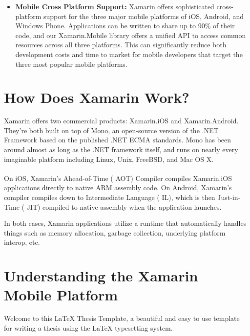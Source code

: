 \begin{itemize}
   \item \textbf{Mobile Cross Platform Support:}   Xamarin offers sophisticated cross-platform support for the three major mobile platforms of iOS, Android, and Windows Phone. Applications can be written to share up to 90\% of their code, and our Xamarin.Mobile library offers a unified API to access common resources across all three platforms. This can significantly reduce both development costs and time to market for mobile developers that target the three most popular mobile platforms.

 \end{itemize}










 \section{How Does Xamarin Work?}

 Xamarin offers two commercial products: Xamarin.iOS and Xamarin.Android.
 They’re both built on top of Mono, an open-source version of the .NET Framework based on the published .NET ECMA standards.
 Mono has been around almost as long as the .NET framework itself, and runs on nearly every imaginable platform including Linux, Unix, FreeBSD, and Mac OS X.

\paragraph{}
On iOS, Xamarin’s Ahead-of-Time ( AOT) Compiler compiles Xamarin.iOS applications directly to native ARM assembly code. On Android, Xamarin’s compiler compiles down to Intermediate Language ( IL), which is then Just-in-Time ( JIT) compiled to native assembly when the application launches.

In both cases, Xamarin applications utilize a runtime that automatically handles things such as memory allocation, garbage collection, underlying platform interop, etc.


\section{Understanding the Xamarin Mobile Platform}
Welcome to this \LaTeX{} Thesis Template, a beautiful and easy to use template for writing a thesis using the \LaTeX{} typesetting system.

